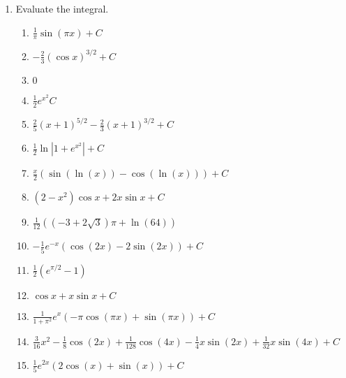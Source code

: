 \documentclass[letterpaper]{article}
\begin{document}
\begin{enumerate}

\item Evaluate the integral.
	\begin{enumerate}

	\item $\frac1\pi \sin(\pi x) +C$

	\item $-\frac23 (\cos x)^{3/2}+C$

	\item $0$

	\item $\frac12 e^{x^2} C$

	\item $\frac25 (x+1)^{5/2}-\frac23(x+1)^{3/2} +C$

	\item $\frac12 \ln\left|1+e^{x^2}\right|+C$

	\item $\frac x2 \left(\sin(\ln(x))-\cos(\ln(x))\right)+C$

	\item $(2-x^2)\cos x + 2x\sin x +C$

	\item $\frac{1}{12} \left(\left(-3+2 \sqrt{3}\right) \pi +\ln(64)\right)$

	\item $-\frac15 e^{-x}(\cos (2x)-2\sin(2x))+C$

	\item $\frac12 (e^{\pi/2}-1)$

	\item $\cos x + x\sin x +C$

	\item $\frac1{1+\pi^2} e^x(-\pi \cos(\pi x)+\sin(\pi x))+C$

	\item $\frac{3}{16}x^2-\frac{1}{8} \cos(2 x)+\frac{1}{128} \cos(4 x)-\frac{1}{4} x \sin(2 x)+\frac{1}{32} x \sin(4 x)+C$

	\item $\frac{1}{5} e^{2 x} (2 \cos(x)+\sin(x))+C$


\end{enumerate}
\end{enumerate}
\end{document}
